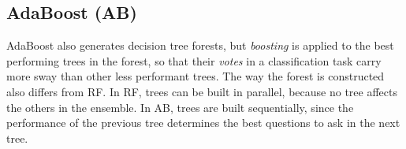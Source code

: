 \subsection{AdaBoost (AB)}
AdaBoost \cite{schapire1999} also generates decision tree forests,
but {\it boosting} is applied to the best performing trees in
the forest, so that their {\it votes} in a classification task
carry more sway than other less performant trees.  The way the
forest is constructed also differs from RF.  In RF, trees can be
built in parallel, because no tree affects the others in the
ensemble.  In AB, trees are built sequentially, since the
performance of the previous tree determines the best questions
to ask in the next tree.